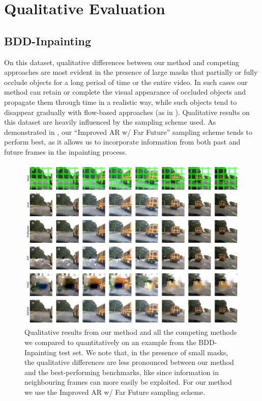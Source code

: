 \section{Qualitative Evaluation}
\subsection{BDD-Inpainting}
On this dataset, qualitative differences between our method and competing approaches are most evident in the presence of large masks that partially or fully occlude objects for a long period of time or the entire video. In such cases our method can retain or complete the visual appearance of occluded objects and propagate them through time in a realistic way, while such objects tend to disappear gradually with flow-based approaches (as in ). Qualitative results on this dataset are heavily influenced by the sampling scheme used. As demonstrated in , our ``Improved AR w/ Far Future'' sampling scheme tends to perform best, as it allows us to incorporate information from both past and future frames in the inpainting process. 
\begin{figure}[t]
    \begin{center}
        \centering
        \captionsetup{type=figure}
        \includegraphics[width=\linewidth]{figures/additional-samples/bus_all.pdf}
        \caption[Qualitative results from our method and all competing methods on an example from the BDD-Inpainting-Blobs test set.]{Qualitative results from our method and all the competing methods we compared to quantitatively on an example from the BDD-Inpainting test set. We note that, in the presence of small masks, the qualitative differences are less pronounced between our method and the best-performing benchmarks, like since information in neighbouring frames can more easily be exploited. For our method we use the Improved AR w/ Far Future sampling scheme.}
        \label{fig:bus}
    \end{center}
    \end{figure}
    
